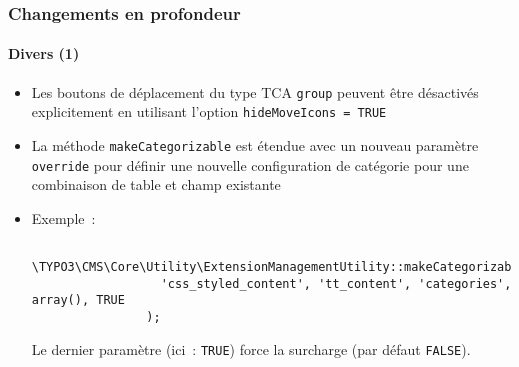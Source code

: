 \begin{frame}[fragile]
	\frametitle{Changements en profondeur}
	\framesubtitle{Divers (1)}

	\begin{itemize}

		\item Les boutons de déplacement du type TCA \texttt{group} peuvent être désactivés
			explicitement en utilisant l'option \texttt{hideMoveIcons = TRUE}

		\item La méthode \texttt{makeCategorizable} est étendue avec un nouveau paramètre
			\texttt{override} pour définir une nouvelle configuration de catégorie pour une
			combinaison de table et champ existante

		\item Exemple~:

			\begin{lstlisting}
				\TYPO3\CMS\Core\Utility\ExtensionManagementUtility::makeCategorizable(
				  'css_styled_content', 'tt_content', 'categories', array(), TRUE
				);
			\end{lstlisting}

			\small
				Le dernier paramètre (ici~: \texttt{TRUE}) force la surcharge (par défaut \texttt{FALSE}).
			\normalsize

	\end{itemize}

\end{frame}



